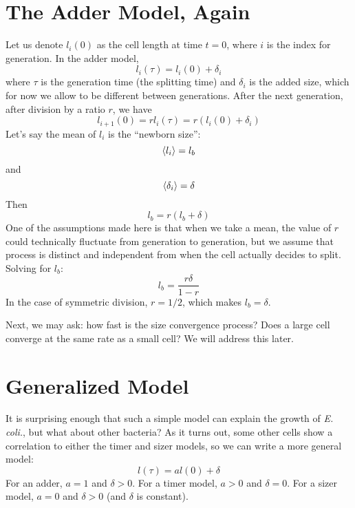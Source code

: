 \documentclass[a4paper,twoside,master.tex]{subfiles}
\begin{document}

\section{The Adder Model, Again}\label{sec:the_adder_model,_again}

Let us denote $ l_i(0) $ as the cell length at time $ t = 0 $, where $ i $ is the index for generation. In the adder model,
\begin{equation}
    l_i(\tau) = l_i(0) + \delta_i
\end{equation}
where $ \tau $ is the generation time (the splitting time) and $ \delta_i $ is the added size, which for now we allow to be different between generations. After the next generation, after division by a ratio $ r $, we have
\begin{equation}
    l_{i+1}(0) = r l_i(\tau) = r\left( l_i(0) + \delta_i \right)
\end{equation}
Let's say the mean of $ l_i $ is the ``newborn size'':
\begin{equation}
    \ev{l_i} = l_b
\end{equation}
and
\begin{equation}
    \ev{\delta_i} = \delta
\end{equation}
Then
\begin{equation}
    l_b = r (l_b + \delta)
\end{equation}
One of the assumptions made here is that when we take a mean, the value of $ r $ could technically fluctuate from generation to generation, but we assume that process is distinct and independent from when the cell actually decides to split. Solving for $ l_b $:
\begin{equation}
    l_b = \frac{r \delta}{1-r}
\end{equation}
In the case of symmetric division, $ r = 1/2 $, which makes $ l_b = \delta $.

Next, we may ask: how fast is the size convergence process? Does a large cell converge at the same rate as a small cell? We will address this later.

\section{Generalized Model}\label{sec:generalized_model}


It is surprising enough that such a simple model can explain the growth of \textit{E. coli.}, but what about other bacteria? As it turns out, some other cells show a correlation to either the timer and sizer models, so we can write a more general model:
\begin{equation}
    l(\tau) = al(0) + \delta
\end{equation}
For an adder, $ a = 1 $ and $ \delta > 0 $. For a timer model, $ a > 0 $ and $ \delta = 0 $. For a sizer model, $ a = 0 $ and $ \delta > 0 $ (and $ \delta $ is constant).
\end{document}

